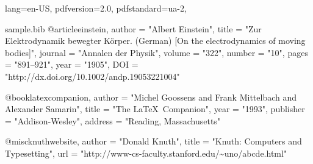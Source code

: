 \DocumentMetadata
  {
    lang=en-US,
    pdfversion=2.0,
    pdfstandard=ua-2,
  }
\begin{filecontents}[overwrite]{sample.bib}
@article{einstein,
  author =       "Albert Einstein",
  title =        "{Zur Elektrodynamik bewegter K{\"o}rper}. ({German})
                 [{On} the electrodynamics of moving bodies]",
  journal =      "Annalen der Physik",
  volume =       "322",
  number =       "10",
  pages =        "891--921",
  year =         "1905",
  DOI =          "http://dx.doi.org/10.1002/andp.19053221004"
}

@book{latexcompanion,
    author    = "Michel Goossens and Frank Mittelbach and Alexander Samarin",
    title     = "The \LaTeX\ Companion",
    year      = "1993",
    publisher = "Addison-Wesley",
    address   = "Reading, Massachusetts"
}
 
@misc{knuthwebsite,
    author    = "Donald Knuth",
    title     = "Knuth: Computers and Typesetting",
    url       = "http://www-cs-faculty.stanford.edu/\~{}uno/abcde.html"
}
\end{filecontents}

\documentclass{article}
\usepackage{natbib}
\usepackage{har2nat}
\usepackage{hyperref}



text \cite{einstein}

As  and  describe \ldots

manuals  describe \ldots

\citeyear{latexcompanion}


\medskip






